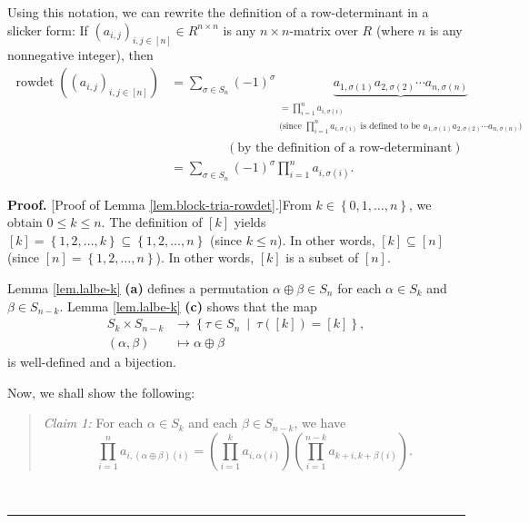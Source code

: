 \documentclass
[numbers=enddot,12pt,final,onecolumn,notitlepage,english]{scrartcl}%
\theoremstyle{definition}
\newenvironment{statement}{\begin{quote}}{\end{quote}}
\newenvironment{proof}[1][Proof]{\noindent\textbf{#1.} }{\ \rule{0.5em}{0.5em}}
\let\sumnonlimits\sum
\let\prodnonlimits\prod
\renewcommand{\sum}{\sumnonlimits\limits}
\renewcommand{\prod}{\prodnonlimits\limits}
\newenvironment{verlong}{}{}
\begin{document}
\begin{verlong}
Using this notation, we can rewrite the definition of a row-determinant in a
slicker form: If $\left(  a_{i,j}\right)  _{i,j\in\left[  n\right]  }\in
R^{n\times n}$ is any $n\times n$-matrix over $R$ (where $n$ is any
nonnegative integer), then%
\begin{align}
\operatorname*{rowdet}\left(  \left(  a_{i,j}\right)  _{i,j\in\left[
n\right]  }\right)   &  =\sum_{\sigma\in S_{n}}\left(  -1\right)  ^{\sigma
}\underbrace{a_{1,\sigma\left(  1\right)  }a_{2,\sigma\left(  2\right)
}\cdots a_{n,\sigma\left(  n\right)  }}_{\substack{=\prod_{i=1}^{n}%
a_{i,\sigma\left(  i\right)  }\\\text{(since }\prod_{i=1}^{n}a_{i,\sigma
\left(  i\right)  }\text{ is defined to be }a_{1,\sigma\left(  1\right)
}a_{2,\sigma\left(  2\right)  }\cdots a_{n,\sigma\left(  n\right)  }\text{)}%
}}\nonumber\\
&  \ \ \ \ \ \ \ \ \ \ \ \ \ \ \ \ \ \ \ \ \left(  \text{by the definition of
a row-determinant}\right) \nonumber\\
&  =\sum_{\sigma\in S_{n}}\left(  -1\right)  ^{\sigma}\prod_{i=1}%
^{n}a_{i,\sigma\left(  i\right)  }. \label{pf.lem.block-tria-rowdet.rowdet=}%
\end{align}


\begin{proof}
[Proof of Lemma \ref{lem.block-tria-rowdet}.]From $k\in\left\{  0,1,\ldots
,n\right\}  $, we obtain $0\leq k\leq n$. The definition of $\left[  k\right]
$ yields $\left[  k\right]  =\left\{  1,2,\ldots,k\right\}  \subseteq\left\{
1,2,\ldots,n\right\}  $ (since $k\leq n$). In other words, $\left[  k\right]
\subseteq\left[  n\right]  $ (since $\left[  n\right]  =\left\{
1,2,\ldots,n\right\}  $). In other words, $\left[  k\right]  $ is a subset of
$\left[  n\right]  $.

Lemma \ref{lem.lalbe-k} \textbf{(a)} defines a permutation $\alpha\oplus
\beta\in S_{n}$ for each $\alpha\in S_{k}$ and $\beta\in S_{n-k}$. Lemma
\ref{lem.lalbe-k} \textbf{(c)} shows that the map
\begin{align*}
S_{k}\times S_{n-k}  &  \rightarrow\left\{  \tau\in S_{n}\ \mid\ \tau\left(
\left[  k\right]  \right)  =\left[  k\right]  \right\}  ,\\
\left(  \alpha,\beta\right)   &  \mapsto\alpha\oplus\beta
\end{align*}
is well-defined and a bijection.

Now, we shall show the following:

\begin{statement}
\textit{Claim 1:} For each $\alpha\in S_{k}$ and each $\beta\in S_{n-k}$, we
have%
\begin{equation}
\prod_{i=1}^{n}a_{i,\left(  \alpha\oplus\beta\right)  \left(  i\right)
}=\left(  \prod_{i=1}^{k}a_{i,\alpha\left(  i\right)  }\right)  \left(
\prod_{i=1}^{n-k}a_{k+i,k+\beta\left(  i\right)  }\right)  .
\label{pf.lem.block-tria-rowdet.prod=prodprod}%
\end{equation}


\end{statement}
\end{proof}
\end{verlong}
\end{document}
